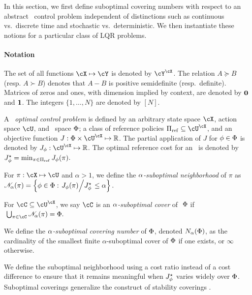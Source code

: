 In this section, we first define suboptimal covering numbers
with respect to an abstract \multienv\ control problem
independent of distinctions
such as continuous vs.\ discrete time and stochastic vs.\ deterministic.
We then instantiate these notions for a particular class of LQR problems.

\paragraph{Notation}
The set of all functions $\cX \mapsto \cY$ is denoted by $\cY^\cX$.
The relation $A \succeq B$ (resp. ${A \succ B}$) denotes that $A - B$ is positive semidefinite (resp.\ definite).
Matrices of zeros and ones, with dimension implied by context, are denoted by $\mathbf{0}$ and $\mathbf{1}$.
The integers $\{1, \dots, N\}$ are denoted by $[N]$.




\begin{definition}%
	A \emph{\multienv\ optimal control problem} is defined by
	an arbitrary state space $\cX$,
	action space $\cU$,
	and \envword\ space $\Phi$;
	a class of reference policies $\Refpolicies \subseteq \cU^\cX$,
	and an objective function $J : \Envs \times \cU^\cX \mapsto \R$.
	The partial application of $J$ for $\phi \in \Phi$
	is denoted by $J_\env : \cU^\cX \mapsto \R$.
	The optimal reference cost for an \envword\ is denoted by
	$J^\star_\phi = \min_{\pi \in \Pi_{\mathrm{ref}}} J_\phi(\pi)$.
\end{definition}



\begin{definition}%
\label{def:suboptimal-neighborhood}
	For $\pi : \cX \mapsto \cU$ and $\alpha > 1$,
	we define the \emph{$\alpha$-suboptimal neighborhood} of $\pi$ as
	\(
		\mathscr{N}_{\alpha}(\pi) = \left\{
			\phi \in \Phi :
			\left. J_\phi(\pi) \middle/ J^\star_\phi \right.
			\leq \alpha
		\right\}.
	\)
\end{definition}

\begin{definition}%
\label{def:suboptimal-covering}
	For $\coveringset \subseteq \cU^\cX$,
	we say $\coveringset$ is an \emph{$\alpha$-suboptimal cover} of $\ \Phi$
	if
	\(
		\ \bigcup_{\pi \in \coveringset} \suboptneighb{\subopt}{\pi}
		= \Envs.
	\)
\end{definition}

\begin{definition}%
\label{def:suboptimal-covering-number}
	We define the \emph{$\alpha$-suboptimal covering number} of $\Phi$,
	denoted $N_{\alpha}(\Phi)$,
	as the cardinality of the smallest finite $\alpha$-suboptimal cover of $\Phi$ if one exists,
	or $\infty$ otherwise.
\end{definition}

We define the suboptimal neighborhood using a cost ratio
instead of a cost difference
to ensure that it remains meaningful
when
$J^\star_\phi$ varies widely over $\Phi$.
Suboptimal coverings generalize the construct of stability coverings
\citep{stilwell-interpolation}.

